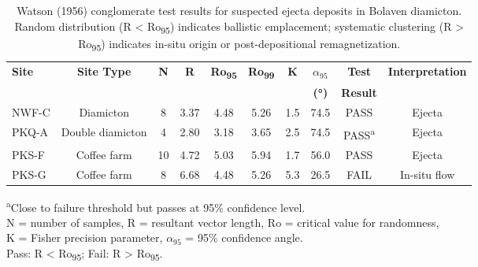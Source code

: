 
\begin{table}[htbp]
    \centering
    \caption{Watson (1956) conglomerate test results for suspected ejecta deposits in Bolaven diamicton. Random distribution (R < Ro\textsubscript{95}) indicates ballistic emplacement; systematic clustering (R > Ro\textsubscript{95}) indicates in-situ origin or post-depositional remagnetization.}
    \label{tab:conglomerate_tests}
    \footnotesize
    \begin{tabular}{|l|c|c|c|c|c|c|c|c|c|}
        \hline
        \textbf{Site} & \textbf{Site Type} & \textbf{N} & \textbf{R} & \textbf{Ro\textsubscript{95}} & \textbf{Ro\textsubscript{99}} & \textbf{K} & \textbf{$\alpha_{95}$} & \textbf{Test} & \textbf{Interpretation} \\
        & & & & & & & \textbf{(°)} & \textbf{Result} & \\
        \hline
        NWF-C & Diamicton & 8 & 3.37 & 4.48 & 5.26 & 1.5 & 74.5 & PASS & Ejecta \\
        PKQ-A & Double diamicton & 4 & 2.80 & 3.18 & 3.65 & 2.5 & 74.5 & PASS\textsuperscript{a} & Ejecta \\
        PKS-F & Coffee farm & 10 & 4.72 & 5.03 & 5.94 & 1.7 & 56.0 & PASS & Ejecta \\
        PKS-G & Coffee farm & 8 & 6.68 & 4.48 & 5.26 & 5.3 & 26.5 & FAIL & In-situ flow \\
        \hline
    \end{tabular}
    
    \vspace{0.5em}
    \raggedright
    \footnotesize
    \textsuperscript{a}Close to failure threshold but passes at 95\% confidence level.\\
    N = number of samples, R = resultant vector length, Ro = critical value for randomness,\\
    K = Fisher precision parameter, $\alpha_{95}$ = 95\% confidence angle.\\
    Pass: R < Ro\textsubscript{95}; Fail: R > Ro\textsubscript{95}.
\end{table}


